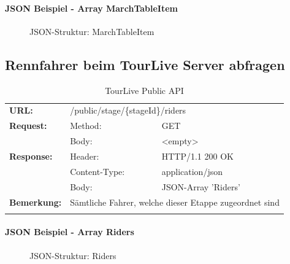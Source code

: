 \paragraph{JSON Beispiel - Array MarchTableItem}
\begin{figure}[H]
	\centering
	
	\caption{JSON-Struktur: MarchTableItem}
\end{figure}

\subsection{Rennfahrer beim TourLive Server abfragen}
\begin{longtable}{ p{2.5cm} p{3.5cm} p{6cm}}	
	\textbf{URL:} & \multicolumn{2}{l}{/public/stage/\{stageId\}/riders} \\
	\textbf{Request:} & Method: & GET \\
		& Body: & <empty>\\
	\textbf{Response:} &  Header: & HTTP/1.1 200 OK \\
		& Content-Type: & application/json \\
		& Body: & JSON-Array 'Riders'\\
	\textbf{Bemerkung:} & \multicolumn{2}{p{10cm}}{Sämtliche Fahrer, welche dieser Etappe zugeordnet sind} \\ [1ex] 
\caption{TourLive Public API}
\end{longtable}

\paragraph{JSON Beispiel - Array Riders}
\begin{figure}[H]
	\centering
	
	\caption{JSON-Struktur: Riders}
\end{figure}




